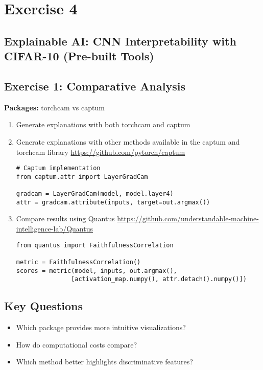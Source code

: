 \chapter*{Exercise 4}
\section*{Explainable AI: CNN Interpretability with CIFAR-10 (Pre-built Tools)}

\section*{Exercise 1: Comparative Analysis }
\textbf{Packages:} torchcam vs captum

\begin{enumerate}
\item Generate explanations with both torchcam and captum 
\item Generate explanations with other methods available in the captum and torchcam library \url{https://github.com/pytorch/captum} 
\begin{verbatim}
# Captum implementation
from captum.attr import LayerGradCam

gradcam = LayerGradCam(model, model.layer4)
attr = gradcam.attribute(inputs, target=out.argmax())
\end{verbatim}

\item Compare results using Quantus \url{https://github.com/understandable-machine-intelligence-lab/Quantus}
\begin{verbatim}
from quantus import FaithfulnessCorrelation

metric = FaithfulnessCorrelation()
scores = metric(model, inputs, out.argmax(), 
               [activation_map.numpy(), attr.detach().numpy()])
\end{verbatim}
\end{enumerate}

\section*{Key Questions}
\begin{itemize}
\item Which package provides more intuitive visualizations?
\item How do computational costs compare?
\item Which method better highlights discriminative features?
\end{itemize}

